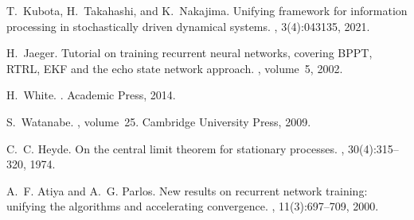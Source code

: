\documentclass{article}
\begin{document}
\begin{thebibliography}{10}
T.~Kubota, H.~Takahashi, and K.~Nakajima.
\newblock Unifying framework for information processing in stochastically
  driven dynamical systems.
, 3(4):043135, 2021.

H.~Jaeger.
\newblock Tutorial on training recurrent neural networks, covering BPPT,
  RTRL, EKF and the echo state network approach. 
, volume~5, 2002.

H.~White.
.
\newblock Academic Press, 2014.

S.~Watanabe.
, volume~25.
\newblock Cambridge University Press, 2009.

C.~C. Heyde.
\newblock On the central limit theorem for stationary processes.
, 30(4):315--320, 1974.

A.~F. Atiya and A.~G. Parlos.
\newblock New results on recurrent network training: unifying the algorithms
  and accelerating convergence.
, 11(3):697--709, 2000.

\end{thebibliography}


% 
% 
% 
\end{document}
